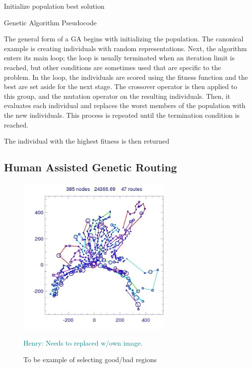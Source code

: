 \documentclass{sig-alternate}
\newcommand{\allcomments}[1]{{#1}}
\newcommand{\hfcomment}[1]{\textcolor{Teal}{\allcomments{Henry: {#1}}}}
\begin{document}
\begin{algorithm}
Initialize population\;
\Return best solution\;
\caption{Genetic Algorithm Pseudocode\label{GA}}
\end{algorithm}

The general form of a GA begins with initializing the population. The canonical example is creating individuals with random representations. Next, the algorithm enters its main loop; the loop is usually terminated when an iteration limit is reached, but other conditions are sometimes used that are specific to the problem. In the loop, the individuals are scored using the fitness function and the best are set aside for the next stage. The crossover operator is then applied to this group, and the mutation operator on the resulting individuals. Then, it evaluates each individual and replaces the worst members of the population with the new individuals. This process is repeated until the termination condition is reached.

The individual with the highest fitness is then returned
\subsection{Human Assisted Genetic Routing}
\label{sec:humans}
\begin{figure}
\centering
\includegraphics[width=3in, keepaspectratio]{vrp2.jpg}
\caption{To be example of selecting good/bad regions}
\hfcomment{Needs to replaced w/own image.}
\label{fig:Humangraph}
\end{figure}
\end{document}
